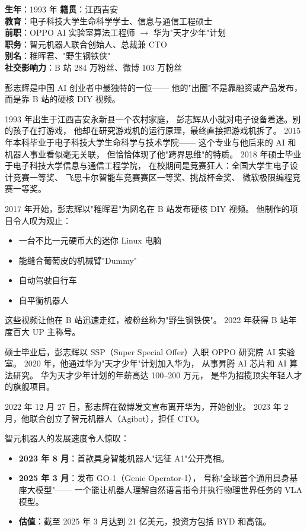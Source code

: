 \begin{keybox}
\textbf{生年}：1993 年 \quad \textbf{籍贯}：江西吉安 \\
\textbf{教育}：电子科技大学生命科学学士、信息与通信工程硕士 \\
\textbf{前职}：OPPO AI 实验室算法工程师 $\to$ 华为"天才少年"计划 \\
\textbf{职务}：智元机器人联合创始人、总裁兼 CTO \\
\textbf{别名}：稚晖君、"野生钢铁侠" \\
\textbf{社交影响力}：B 站 284 万粉丝、微博 103 万粉丝
\end{keybox}

彭志辉是中国 AI 创业者中最独特的一位——
他的"出圈"不是靠融资或产品发布，而是靠 B 站的硬核 DIY 视频。

1993 年出生于江西吉安永新县一个农村家庭，
彭志辉从小就对电子设备着迷。别的孩子在打游戏，
他却在研究游戏机的运行原理，最终直接把游戏机拆了。
2015 年本科毕业于电子科技大学生命科学与技术学院——
这个专业与他后来的 AI 和机器人事业看似毫无关联，
但恰恰体现了他"跨界思维"的特质。
2018 年硕士毕业于电子科技大学信息与通信工程学院，
在校期间是竞赛狂人：全国大学生电子设计竞赛一等奖、
飞思卡尔智能车竞赛赛区一等奖、挑战杯金奖、
微软极限编程竞赛一等奖。

2017 年开始，彭志辉以"稚晖君"为网名在 B 站发布硬核 DIY 视频。
他制作的项目令人叹为观止：
\begin{itemize}[noitemsep]
  \item 一台不比一元硬币大的迷你 Linux 电脑
  \item 能缝合葡萄皮的机械臂"Dummy"
  \item 自动驾驶自行车
  \item 自平衡机器人
\end{itemize}
这些视频让他在 B 站迅速走红，被粉丝称为"野生钢铁侠"。
2022 年获得 B 站年度百大 UP 主称号。

硕士毕业后，彭志辉以 SSP（Super Special Offer）入职 OPPO 研究院 AI 实验室。
2020 年，他通过华为"天才少年"计划加入华为，
从事昇腾 AI 芯片和 AI 算法研究。
华为天才少年计划的年薪高达 100--200 万元，
是华为招揽顶尖年轻人才的旗舰项目。

2022 年 12 月 27 日，彭志辉在微博发文宣布离开华为，开始创业。
2023 年 2 月，他联合创立了智元机器人（Agibot），担任 CTO。

智元机器人的发展速度令人惊叹：
\begin{itemize}[noitemsep]
  \item \textbf{2023 年 8 月}：首款具身智能机器人"远征 A1"公开亮相。
  \item \textbf{2025 年 3 月}：发布 GO-1（Genie Operator-1），
        号称"全球首个通用具身基座大模型"——
        一个能让机器人理解自然语言指令并执行物理世界任务的 VLA 模型。
  \item \textbf{估值}：截至 2025 年 3 月达到 21 亿美元，投资方包括 BYD 和高瓴。
\end{itemize}

